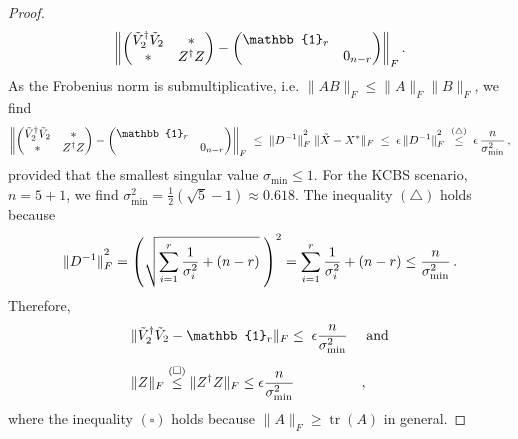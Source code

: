 \begin{proof}
\begin{equation*}
\left\|
\begin{pmatrix}
\Tilde{V}_2^{\dag}\Tilde{V}_2 & * \\
* & Z^{\dag}Z
\end{pmatrix}
-
\begin{pmatrix}
\mathbb{1}_r & \\
& 0_{n-r}
\end{pmatrix}
\right\|_F.
\end{equation*}
As the Frobenius norm is submultiplicative, i.e. $\|AB\|_F\leq\|A\|_F\|B\|_F$, we find
\begin{equation*}
\left\|
\begin{pmatrix}
\Tilde{V}_2^{\dag}\Tilde{V}_2 & * \\
* & Z^{\dag}Z
\end{pmatrix}
-
\begin{pmatrix}
\mathbb{1}_r & \\
& 0_{n-r}
\end{pmatrix}
\right\|_F\;\leq\;\|D^{-1}\|^{\textstyle ^2}_F\;\|\Tilde{X}-X^{*}\|_F\; \leq\; \epsilon\thinspace\|D^{-1}\|_F^{\textstyle ^2}\;\stackrel{(\bigtriangleup)}{\leq}\;\epsilon\thinspace \frac{n}{\sigma_{\text{min}}^2}\thinspace,
\end{equation*}
provided that the smallest singular value $\sigma_{\text{min}}\leq 1$. For the KCBS scenario, $n=5+1$, we find $\sigma^2_{\text{min}}=\frac{1}{2}(\sqrt{5}-1)\approx 0.618$. The inequality $(\bigtriangleup)$ holds because
\begin{equation*}
\|D^{-1}\|_F^{\textstyle ^2} = \left(\sqrt{\sum_{i=1}^r \frac{1}{\sigma_i^2}+(n-r)}\;\right)^2=\sum_{i=1}^r\frac{1}{\sigma_i^2}+(n-r)\leq\frac{n}{\sigma_{\text{min}}^2}\thinspace. 
\end{equation*}
Therefore,
\begin{alignat*}{2}
& \|\Tilde{V}_2^{\dag}\Tilde{V}_2-\mathbb{1}_r\|_F\leq\;\epsilon\frac{n}{\sigma_{\text{min}}^2} && \text{ and}\\[0.5em]
& \|Z\|_F \stackrel{(\square)}{\leq} \|Z^{\dag}Z\|_F \leq \epsilon\frac{n}{\sigma_{\text{min}}^2}&&,
\end{alignat*}
where the inequality $(\square)$ holds because $\|A\|_F\geq\operatorname{tr}(A)$ in general. 



\end{proof}
